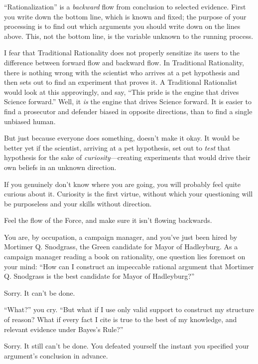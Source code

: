{
 ``Rationalization'' is a
\textit{backward} flow from conclusion to selected evidence. First you
write down the bottom line, which is known and fixed; the purpose of
your processing is to find out which arguments you should write down on
the lines above. This, not the bottom line, is the variable unknown to
the running process.}

{
 I fear that Traditional Rationality does not properly sensitize
its users to the difference between forward flow and backward flow. In
Traditional Rationality, there is nothing wrong with the scientist who
arrives at a pet hypothesis and then sets out to find an experiment
that proves it. A Traditional Rationalist would look at this
approvingly, and say, ``This pride is the engine that
drives Science forward.'' Well, it \textit{is} the
engine that drives Science forward. It is easier to find a prosecutor
and defender biased in opposite directions, than to find a single
unbiased human.}

{
 But just because everyone does something, doesn't
make it okay. It would be better yet if the scientist, arriving at a
pet hypothesis, set out to \textit{test} that hypothesis for the sake
of \textit{curiosity}{}---creating experiments that would drive their
own beliefs in an unknown direction.}

{
 If you genuinely don't know where you are going,
you will probably feel quite curious about it. Curiosity is the first
virtue, without which your questioning will be purposeless and your
skills without direction.}

{
 Feel the flow of the Force, and make sure it isn't
flowing backwards.}

\myendsectiontext


{
 You are, by occupation, a campaign manager, and
you've just been hired by Mortimer Q. Snodgrass, the
Green candidate for Mayor of Hadleyburg. As a campaign manager reading
a book on rationality, one question lies foremost on your mind:
``How can I construct an impeccable rational argument
that Mortimer Q. Snodgrass is the best candidate for Mayor of
Hadleyburg?'' }

{
 Sorry. It can't be done.}

{
 ``What?'' you cry.
``But what if I use only valid support to construct my
structure of reason? What if every fact I cite is true to the best of
my knowledge, and relevant evidence under Bayes's
Rule?''}

{
 Sorry. It still can't be done. You defeated
yourself the instant you specified your argument's
conclusion in advance.}

